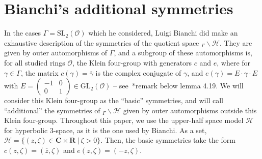 \documentclass[twoside,a4paper,12 pt]{amsart}
\newcommand{\ringO}{\mathcal{O}}
\newcommand{\Hy}{\mathcal{H}}
\newcommand{\C}{{\mathbf{C}}}
\newcommand{\R}{{\mathbf{R}}}
\theoremstyle{plain}
\theoremstyle{definition}
\theoremstyle{remark}
\begin{document}
\section{Bianchi's additional symmetries} \label{Bianchi's additional symmetries}
In the cases $\Gamma = \mathrm{SL_2}(\ringO)$ which he considered, 
Luigi Bianchi did make an exhaustive description of the symmetries of the quotient space $_\Gamma \backslash \Hy$.
They are given by outer automorphisms of $\Gamma$, and a subgroup of these automorphisms is, for all studied rings $\ringO$, 
the Klein four-group with generators $c$ and $e$,
where for $\gamma \in \Gamma$, the matrix $c(\gamma) = \overline{\gamma}$ is the complex conjugate of $\gamma$, and $e(\gamma) = E\cdot \gamma \cdot E$ with
$E = \begin{pmatrix}    -1 & 0 \\ 
			 0 & 1 \end{pmatrix} 
			 \in \text{GL}_2(\ringO)$
-- see~\cite{Swan}*{remark below lemma 4.19}.
We will consider this Klein four-group as the ``basic'' symmetries, and will call ``additional'' the symmetries of $_\Gamma \backslash \Hy$
given by outer automorphisms outside this Klein four-group.
Throughout this paper, we use the upper-half space model $\Hy$ for hyperbolic $3$-space, as it is the one used by Bianchi.
As a set, $ \Hy = \{ (z,\zeta) \in \C \times \R \medspace | \medspace \zeta > 0 \}.$
Then, the basic symmetries take the form $c(z,\zeta) = (\overline{z},\zeta)$ and $e(z,\zeta) = (-z,\zeta)$. 
\end{document}
